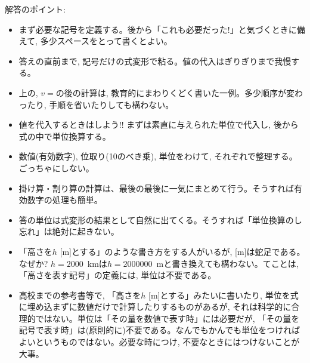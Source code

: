 解答のポイント:
\begin{small}
\begin{itemize}
\item まず必要な記号を定義する。後から「これも必要だった!」と気づくときに備えて, 多少スペースをとって書くとよい。
\item 答えの直前まで, 記号だけの式変形で粘る。値の代入はぎりぎりまで我慢する。
\item 上の, $v=$の後の計算は, 教育的にまわりくどく書いた一例。多少順序が変わったり, 手順を省いたりしても構わない。
\item 値を代入するときはしよう!! まずは素直に与えられた単位で代入し, 後から式の中で単位換算する。
\item 数値(有効数字), 位取り(10のべき乗), 単位をわけて, それぞれで整理する。ごっちゃにしない。
\item 掛け算・割り算の計算は、最後の最後に一気にまとめて行う。そうすれば有効数字の処理も簡単。
\item 答の単位は式変形の結果として自然に出てくる。そうすれば「単位換算のし忘れ」は絶対に起きない。
\item 「高さを$h$ [m]とする」のような書き方をする人がいるが, [m]は蛇足である。なぜか? $h=2000$~kmは$h=2000000$~mと書き換えても構わない。てことは, 「高さを表す記号」の定義には, 単位は不要である。
\item 高校までの参考書等で, 「高さを$h$ [m]とする」みたいに書いたり, 単位を式に埋め込まずに数値だけで計算したりするものがあるが, それは科学的に合理的ではない。単位は「その量を数値で表す時」には必要だが, 「その量を記号で表す時」は(原則的に)不要である。なんでもかんでも単位をつければよいというものではない。必要な時につけ, 不要なときにはつけないことが大事。
\end{itemize}
\end{small}

